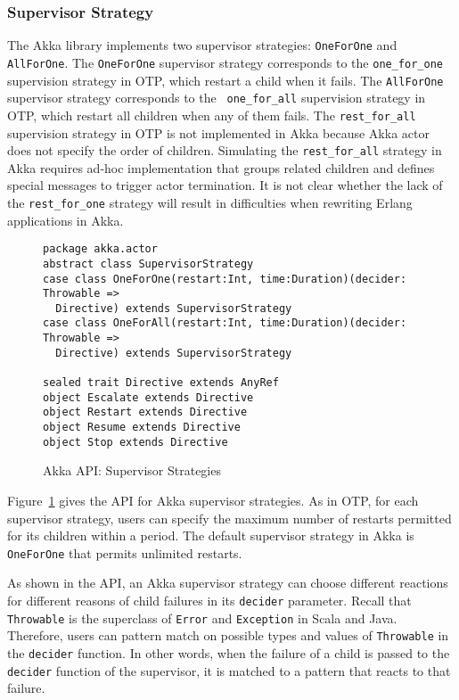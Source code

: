 \subsubsection{Supervisor Strategy}

The Akka library implements two supervisor strategies: {\tt OneForOne} and 
{\tt AllForOne}.  The {\tt OneForOne} supervisor strategy corresponds to the
{\tt one\_for\_one} supervision strategy in OTP, which restart a child when it 
fails.  The {\tt AllForOne} supervisor strategy corresponds to the {\tt 
one\_for\_all} supervision strategy in OTP, which restart all children when 
any of them fails.  The {\tt rest\_for\_all} supervision strategy in OTP is not
implemented in Akka because Akka actor does not specify the order of children.  
Simulating the {\tt rest\_for\_all} strategy in Akka 
requires ad-hoc implementation that groups related children and defines special 
messages to trigger actor termination. It is not clear whether the lack of the 
{\tt rest\_for\_one} strategy will result in difficulties when rewriting Erlang 
applications in Akka.

\begin{figure}[h]
    \begin{lstlisting}    
package akka.actor
abstract class SupervisorStrategy
case class OneForOne(restart:Int, time:Duration)(decider: Throwable => 
  Directive) extends SupervisorStrategy
case class OneForAll(restart:Int, time:Duration)(decider: Throwable => 
  Directive) extends SupervisorStrategy

sealed trait Directive extends AnyRef
object Escalate extends Directive
object Restart extends Directive
object Resume extends Directive
object Stop extends Directive
    \end{lstlisting}
    \caption{Akka API: Supervisor Strategies}
    \label{akka_supervisor_strategy}
\end{figure}

Figure~\ref{akka_supervisor_strategy} gives the API for Akka supervisor 
strategies. As in OTP, for each supervisor strategy, users can specify the 
maximum number of restarts permitted for its children within a period.  The 
default supervisor strategy in Akka is {\tt OneForOne} that permits unlimited 
restarts. 

As shown in the API, an Akka supervisor strategy can choose different 
reactions for different reasons of child failures in its {\tt decider} 
parameter.  Recall that {\tt Throwable} is the superclass of {\tt Error} and 
{\tt Exception} in Scala and Java.  Therefore, users can pattern match on 
possible types and values of {\tt Throwable} in the {\tt decider} function.  In 
other words, when the failure of a child is passed to the {\tt decider} 
function of the supervisor, it is matched to a pattern that reacts to that 
failure.

